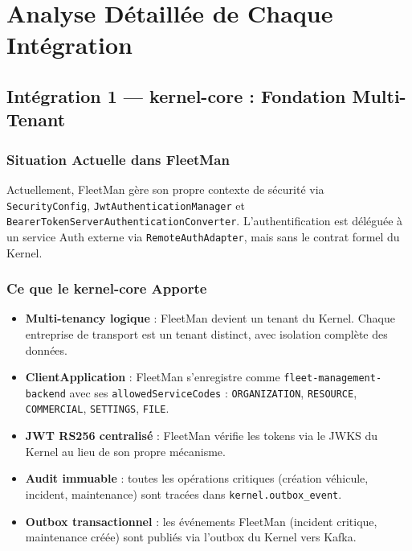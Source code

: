 \documentclass[12pt,a4paper]{report}
\begin{document}
\chapter{Analyse Détaillée de Chaque Intégration}

\section{Intégration 1 — kernel-core : Fondation Multi-Tenant}

\subsection{Situation Actuelle dans FleetMan}

Actuellement, FleetMan gère son propre contexte de sécurité via \texttt{SecurityConfig}, \texttt{JwtAuthenticationManager} et \texttt{BearerTokenServerAuthenticationConverter}. L'authentification est déléguée à un service Auth externe via \texttt{RemoteAuthAdapter}, mais sans le contrat formel du Kernel.

\subsection{Ce que le kernel-core Apporte}

\begin{itemize}[leftmargin=2cm]
  \item \textbf{Multi-tenancy logique} : FleetMan devient un tenant du Kernel. Chaque entreprise de transport est un tenant distinct, avec isolation complète des données.
  \item \textbf{ClientApplication} : FleetMan s'enregistre comme \texttt{fleet-management-backend} avec ses \texttt{allowedServiceCodes} : \texttt{ORGANIZATION}, \texttt{RESOURCE}, \texttt{COMMERCIAL}, \texttt{SETTINGS}, \texttt{FILE}.
  \item \textbf{JWT RS256 centralisé} : FleetMan vérifie les tokens via le JWKS du Kernel au lieu de son propre mécanisme.
  \item \textbf{Audit immuable} : toutes les opérations critiques (création véhicule, incident, maintenance) sont tracées dans \texttt{kernel.outbox\_event}.
  \item \textbf{Outbox transactionnel} : les événements FleetMan (incident critique, maintenance créée) sont publiés via l'outbox du Kernel vers Kafka.
\end{itemize}
\end{document}
